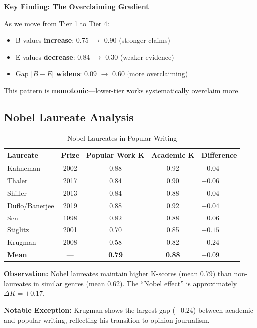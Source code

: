 \documentclass[11pt,a4paper]{article}
\begin{document}
\begin{resultbox}
\textbf{Key Finding: The Overclaiming Gradient}

As we move from Tier 1 to Tier 4:
\begin{itemize}
    \item B-values \textbf{increase}: 0.75 $\to$ 0.90 (stronger claims)
    \item E-values \textbf{decrease}: 0.84 $\to$ 0.30 (weaker evidence)
    \item Gap $|B-E|$ \textbf{widens}: 0.09 $\to$ 0.60 (more overclaiming)
\end{itemize}

This pattern is \textbf{monotonic}---lower-tier works systematically overclaim more.
\end{resultbox}

\subsection{Nobel Laureate Analysis}

\begin{table}[h]
\centering
\caption{Nobel Laureates in Popular Writing}
\begin{tabular}{lcccl}
\toprule
\textbf{Laureate} & \textbf{Prize} & \textbf{Popular Work K} & \textbf{Academic K} & \textbf{Difference} \\
\midrule
Kahneman & 2002 & 0.88 & 0.92 & $-0.04$ \\
Thaler & 2017 & 0.84 & 0.90 & $-0.06$ \\
Shiller & 2013 & 0.84 & 0.88 & $-0.04$ \\
Duflo/Banerjee & 2019 & 0.88 & 0.92 & $-0.04$ \\
Sen & 1998 & 0.82 & 0.88 & $-0.06$ \\
Stiglitz & 2001 & 0.70 & 0.85 & $-0.15$ \\
Krugman & 2008 & 0.58 & 0.82 & $-0.24$ \\
\midrule
\textbf{Mean} & --- & \textbf{0.79} & \textbf{0.88} & \textbf{$-0.09$} \\
\bottomrule
\end{tabular}
\end{table}

\textbf{Observation:} Nobel laureates maintain higher K-scores (mean 0.79) than non-laureates in similar genres (mean 0.62). The ``Nobel effect'' is approximately $\Delta K = +0.17$.

\textbf{Notable Exception:} Krugman shows the largest gap ($-0.24$) between academic and popular writing, reflecting his transition to opinion journalism.
\end{document}
